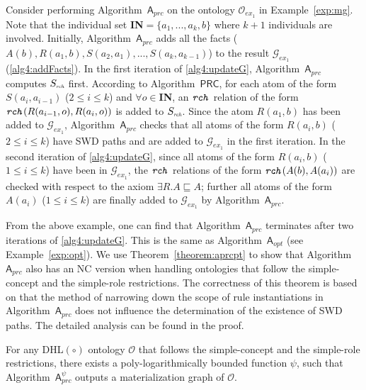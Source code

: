 \documentclass[final,1p,times]{elsarticle}
\begin{document}
\begin{example}\label{exp:prc}
Consider performing Algorithm~$\mathsf{A}_{prc}$ on the ontology
$\mathcal{O}_{ex_1}$ in Example~\ref{exp:mg}. Note that the individual
set \textbf{IN}$=\{a_1,...,a_k,b\}$ where $k+1$ individuals are involved.
Initially, Algorithm~$\mathsf{A}_{prc}$ adds
all the facts ($A(b),R(a_1,b),S(a_2,a_1),...,S(a_{k},a_{k-1})$) to the
result $\mathcal{G}_{ex_1}$ (\ref{alg4:addFacts}). In the first iteration of
\ref{alg4:updateG}, Algorithm~$\mathsf{A}_{prc}$ computes $S_{\textit{\tiny rch}}$ first.
According to Algorithm~$\mathsf{PRC}$, for each atom of the form $S(a_i,a_{i-1})$ ($2\leq i\leq k$)
and $\forall o\in$\textbf{IN},
an $\texttt{\emph{rch}}$ relation of the form $\texttt{\emph{rch}}(R(a_{i-1},o),R(a_i,o))$ is added to
$S_{\textit{\tiny rch}}$. Since the atom $R(a_1,b)$ has been added to $\mathcal{G}_{ex_1}$,
Algorithm~$\mathsf{A}_{prc}$ checks that all atoms of the form $R(a_i,b)$ ($2\leq i\leq k$)
have SWD paths and are added to $\mathcal{G}_{ex_1}$ in the first iteration.
In the second iteration of \ref{alg4:updateG}, since all atoms of the form $R(a_i,b)$ ($1\leq i\leq k$)
have been in $\mathcal{G}_{ex_1}$, the $\texttt{\emph{rch}}$ relations of the form $\texttt{\emph{rch}}(A(b),A(a_i))$
are checked with respect to the axiom $\exists R.A\sqsubseteq A$; further all
atoms of the form $A(a_i)$ ($1\leq i\leq k$) are finally added to $\mathcal{G}_{ex_1}$
by Algorithm~$\mathsf{A}_{prc}$.
\end{example}

From the above example, one can find that Algorithm~$\mathsf{A}_{prc}$ terminates after two iterations
of \ref{alg4:updateG}. This is the same as Algorithm~$\mathsf{A}_{opt}$ (see Example~\ref{exp:opt}).
We use Theorem~\ref{theorem:aprcpt} to show that Algorithm~$\mathsf{A}_{prc}$ also has an NC version when handling ontologies
that follow the simple-concept and the simple-role restrictions.
The correctness of this theorem is based on that the method of narrowing down the scope of rule instantiations in Algorithm~$\mathsf{A}_{prc}$
does not influence the determination of the existence of SWD paths. The detailed analysis
can be found in the proof.

\begin{theorem}\label{theorem:aprcpt}
For any DHL$(\circ)$ ontology $\mathcal{O}$ that follows the simple-concept and the simple-role
restrictions,
there exists a poly-logarithmically bounded function $\psi$,
such that Algorithm~$\mathsf{A}_{prc}^{\psi}$ outputs
a materialization graph of $\mathcal{O}$.
\end{theorem}
\end{document}
